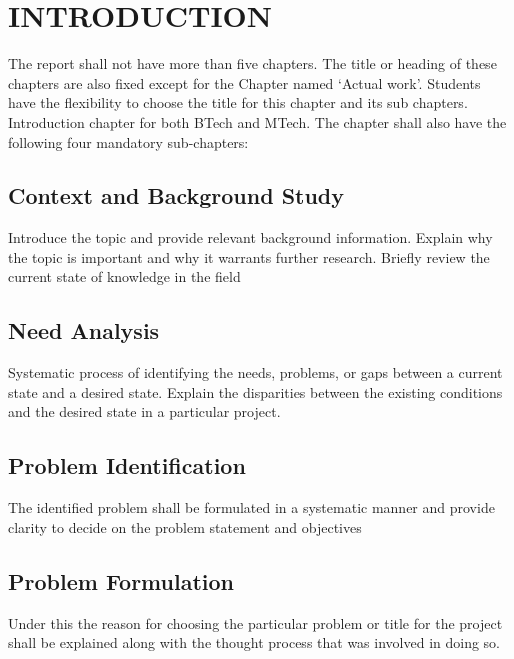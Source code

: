 \chapter{INTRODUCTION} %
\label{ChapterIntroduction} %



The report shall not have more than five chapters. The title or heading of these chapters are also fixed except for the Chapter named ‘Actual work’. Students have the flexibility to choose the title for this chapter and its sub chapters. 
\\
Introduction chapter for both BTech and MTech. The chapter shall also have the following four mandatory sub-chapters: 


\section{Context and Background Study}
Introduce the topic and provide relevant background information. Explain why the topic is important and why it warrants further research.  Briefly review the current state of knowledge in the field

\section{Need Analysis}
Systematic process of identifying the needs, problems, or gaps between a current state and a desired state. Explain the disparities between the existing conditions and the desired state in a particular project.

\section{Problem Identification}
The identified problem shall be formulated in a systematic manner and provide clarity to decide on the problem statement and objectives

\section{Problem Formulation}
Under this the reason for choosing the particular problem or title for the project shall be explained along with the thought process that was involved in doing so.



